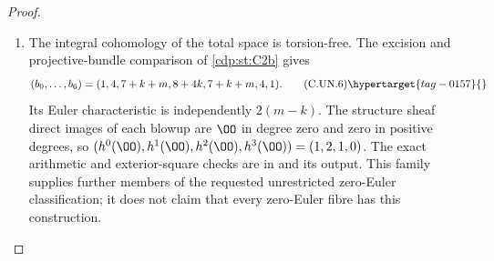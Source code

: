 \begin{proof}
\begin{enumerate}[label={$\langle1\rangle$\arabic*.},leftmargin=*]
\item The integral cohomology of the total space is torsion-free. The
excision and projective-bundle comparison of \ref{cdp:st:C2b} gives
\[
 (b_0,\ldots,b_6)
      =(1,4,7+k+m,8+4k,7+k+m,4,1).                  \tag{C.UN.6}\hypertarget{tag-0157}{}\label{cdp:eq:C.UN.6}
\]
Its Euler characteristic is independently $2(m-k)$. The structure
sheaf direct images of each blowup are $\OO$ in degree zero and
zero in positive degrees, so
$(h^0(\OO),h^1(\OO),h^2(\OO),h^3(\OO))=(1,2,1,0)$.
The exact arithmetic and exterior-square checks are in
 and its output.
This family supplies further members of the requested unrestricted
zero-Euler classification; it does not claim that every zero-Euler
fibre has this construction.

\end{enumerate}
\end{proof}
